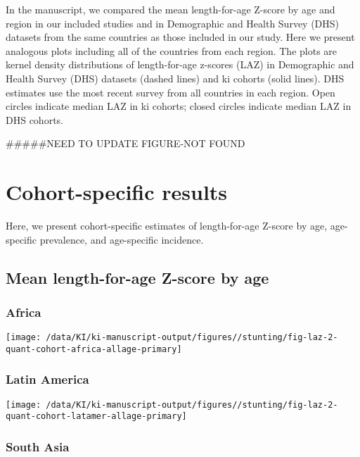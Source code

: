 \documentclass[
  9pt,
]{book}
\begin{document}
\raggedright

In the manuscript, we compared the mean length-for-age Z-score by age and region in our included studies and in Demographic and Health Survey (DHS) datasets from the same countries as those included in our study. Here we present analogous plots including all of the countries from each region. The plots are kernel density distributions of length-for-age z-scores (LAZ) in Demographic and Health Survey (DHS) datasets (dashed lines) and ki cohorts (solid lines). DHS estimates use the most recent survey from all countries in each region. Open circles indicate median LAZ in ki cohorts; closed circles indicate median LAZ in DHS cohorts.

\#\#\#\#\#NEED TO UPDATE FIGURE-NOT FOUND

\hypertarget{cohort}{%
\chapter{Cohort-specific results}\label{cohort}}

\raggedright

Here, we present cohort-specific estimates of length-for-age Z-score by age, age-specific prevalence, and age-specific incidence.

\hypertarget{mean-length-for-age-z-score-by-age}{%
\section{Mean length-for-age Z-score by age}\label{mean-length-for-age-z-score-by-age}}

\hypertarget{africa}{%
\subsection{Africa}\label{africa}}

\texttt{[image: /data/KI/ki-manuscript-output/figures//stunting/fig-laz-2-quant-cohort-africa-allage-primary]}

\hypertarget{latin-america}{%
\subsection{Latin America}\label{latin-america}}

\texttt{[image: /data/KI/ki-manuscript-output/figures//stunting/fig-laz-2-quant-cohort-latamer-allage-primary]}

\hypertarget{south-asia}{%
\subsection{South Asia}\label{south-asia}}
\end{document}
